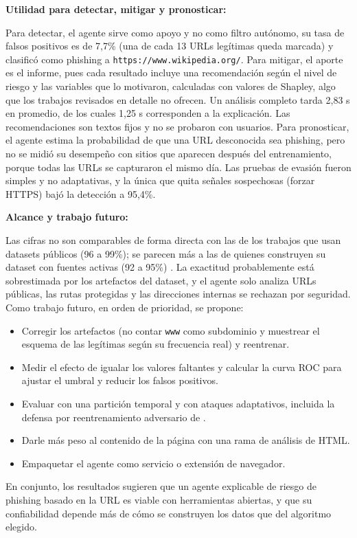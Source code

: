 \textbf{Utilidad para detectar, mitigar y pronosticar:} \par 
Para detectar, el agente sirve como apoyo y no como filtro autónomo, su tasa de falsos positivos es de 7,7\% (una de cada 13 URLs legítimas queda marcada) y clasificó como phishing a \texttt{https://www.wikipedia.org/}. Para mitigar, el aporte es el informe, pues cada resultado incluye una recomendación según el nivel de riesgo y las variables que lo motivaron, calculadas con valores de Shapley, algo que los trabajos revisados en detalle no ofrecen. Un análisis completo tarda 2,83 s en promedio, de los cuales 1,25 s corresponden a la explicación. Las recomendaciones son textos fijos y no se probaron con usuarios. Para pronosticar, el agente estima la probabilidad de que una URL desconocida sea phishing, pero no se midió su desempeño con sitios que aparecen después del entrenamiento, porque todas las URLs se capturaron el mismo día. Las pruebas de evasión fueron simples y no adaptativas, y la única que quita señales sospechosas (forzar HTTPS) bajó la detección a 95,4\%. \newline

\textbf{Alcance y trabajo futuro:} \par 
Las cifras no son comparables de forma directa con las de los trabajos que usan datasets públicos (96 a 99\%); se parecen más a las de quienes construyen su dataset con fuentes activas (92 a 95\%) \cite{duy2024study}. La exactitud probablemente está sobrestimada por los artefactos del dataset, y el agente solo analiza URLs públicas, las rutas protegidas y las direcciones internas se rechazan por seguridad. Como trabajo futuro, en orden de prioridad, se propone: 
\begin{itemize}
    \item Corregir los artefactos (no contar \texttt{www} como subdominio y muestrear el esquema de las legítimas según su frecuencia real) y reentrenar.
    \item Medir el efecto de igualar los valores faltantes y calcular la curva ROC para ajustar el umbral y reducir los falsos positivos.
    \item Evaluar con una partición temporal y con ataques adaptativos, incluida la defensa por reentrenamiento adversario de \cite{duy2024study}.
    \item Darle más peso al contenido de la página con una rama de análisis de HTML.
    \item Empaquetar el agente como servicio o extensión de navegador.
\end{itemize}

En conjunto, los resultados sugieren que un agente explicable de riesgo de phishing basado en la URL es viable con herramientas abiertas, y que su confiabilidad depende más de cómo se construyen los datos que del algoritmo elegido.